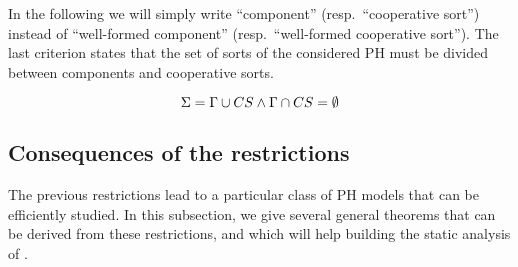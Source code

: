 In the following we will simply write “component” (resp.~“cooperative sort”) instead of “well-formed component” (resp.~“well-formed cooperative sort”).
The last criterion states that the set of sorts of the considered PH must be divided between components and cooperative sorts.

\begin{criterion}
\label{cr:compcs}
  $$\Sigma = \Gamma \cup CS \wedge \Gamma \cap CS = \emptyset$$
\end{criterion}




\subsection{Consequences of the restrictions}

The previous restrictions lead to a particular class of PH models that can be efficiently studied.
In this subsection, we give several general theorems that can be derived from these restrictions,
and which will help building the static analysis of .

